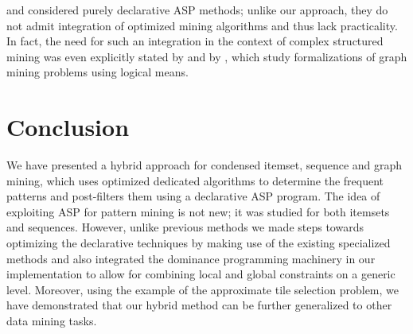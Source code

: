\textcite{DBLP:conf/lpnmr/Jarvisalo11} and \textcite{DBLP:conf/ijcai/GebserGQ0S16} considered purely declarative ASP methods; unlike our approach, they do not admit integration of optimized mining algorithms and thus %
lack 
practicality. In fact, the need for such an integration in the context of complex structured mining was even explicitly stated
by \textcite{query_mining_ilp} and by \textcite{KR_Graphs}, which study formalizations of graph mining problems using logical means. 





\section{Conclusion}\label{sec:conc}

We have presented a hybrid approach for condensed itemset, sequence and graph mining, which uses optimized dedicated algorithms to determine the frequent patterns and post-filters them using a declarative ASP program. The idea of exploiting ASP for pattern mining is not new; it was studied for both itemsets and sequences. However, unlike previous methods we made steps towards optimizing the declarative techniques by making use of the existing specialized methods and also integrated the dominance programming machinery in our implementation to allow for combining local and global constraints on a generic level. Moreover, using the example of the approximate tile selection problem, we have demonstrated that our hybrid method can be further generalized to other data mining tasks.


